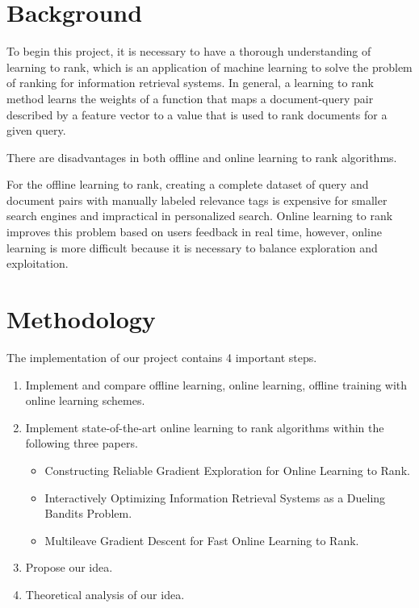 \documentclass[acmlarge]{acmart}
\begin{document}
\section{Background}
To begin this project, it is necessary to have a thorough understanding of learning to rank, which is an application of machine learning to solve the problem of ranking for information retrieval systems. In general, a learning to rank method learns the weights of a function that maps a document-query pair described by a feature vector to a value that is used to rank documents for a given query. 

There are disadvantages in both offline and online learning to rank algorithms. 

For the offline learning to rank, creating a complete dataset of query and document pairs with manually labeled relevance tags is expensive for smaller search engines and impractical in personalized search. Online learning to rank improves this problem based on users feedback in real time, however, online learning is more difficult because it is necessary to balance exploration and exploitation. 

\section{Methodology}
The implementation of our project contains 4 important steps. 

\begin{enumerate}
\item Implement and compare offline learning, online learning, offline training with online learning schemes. 

\item Implement state-of-the-art online learning to rank algorithms within the following three papers. 

\begin{itemize}
    \item Constructing Reliable Gradient Exploration for Online Learning to Rank. \cite{zhao2016constructing}
    
    \item Interactively Optimizing Information Retrieval Systems as a Dueling Bandits Problem. \cite{yue2009interactively}
    
    \item Multileave Gradient Descent for Fast Online Learning to Rank. \cite{schuth2016multileave}
\end{itemize}

\item Propose our idea. 

\item Theoretical analysis of our idea. 

\end{enumerate}
\end{document}
